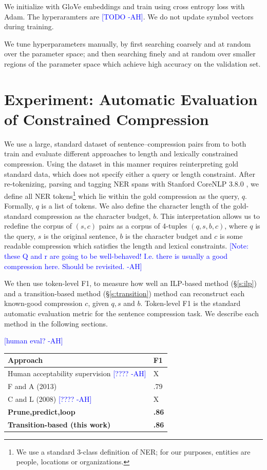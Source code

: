 \documentclass[11pt,a4paper]{article}
\newcommand{\ahcomment}[1]{\textcolor{blue}{[#1 -AH]}}
\begin{document}
We initialize with GloVe embeddings \cite{pennington2014glove} and train using cross entropy loss with Adam. The hyperaramters are \ahcomment{TODO}. We do not update symbol vectors during training. 

We tune hyperparameters manually, by first searching coarsely and at random \cite{Bergstra2012RandomSF} over the parameter space; and then searching finely and at random over smaller regions of the parameter space which achieve high accuracy on the validation set. 

\section{Experiment: Automatic Evaluation of Constrained Compression}

We use a large, standard dataset of sentence--compression pairs from \citet{filippova2013overcoming} to both train and evaluate different approaches to length and lexically constrained compression. Using the dataset in this manner requires reinterpreting gold standard data, which does not specify either a query or length constraint. After re-tokenizing, parsing and tagging NER spans with Stanford CoreNLP 3.8.0 \cite{corenlp}, we define all NER tokens\footnote{We use a standard 3-class definition of NER; for our purposes, entities are people, locations or organizations.} which lie within the gold compression as the query, $q$. Formally, $q$ is a list of tokens. We also define the character length of the gold-standard compression as the character budget, $b$. This interpretation allows us to redefine the corpus of $(s,c)$ pairs as a corpus of 4-tuples $(q,s,b,c)$, where $q$ is the query, $s$ is the original sentence, $b$ is the character budget and $c$ is some readable compression which satisfies the length and lexical constraints.  \ahcomment{Note: these Q and r are going to be well-behaved! I.e. there is usually a good compression here. Should be revisited.}

We then use token-level F1, to measure how well an ILP-based method (\S\ref{s:ilp}) and a transition-based method (\S\ref{s:transition}) method can reconstruct each known-good compression $c$, given $q,s$ and $b$. Token-level F1 is the standard automatic evaluation metric for the sentence compression task. We describe each method in the following sections.

\ahcomment{human eval?}
    
\begin{table}[htb!]
\begin{tabular}{ll}
\centering
Approach & F1  \\ \hline
Human acceptability supervision \ahcomment{????}        &  X        \\
F and A (2013)    & .79           \\
C and L (2008)  \ahcomment{????}  & X      \\
\textbf{Prune,predict,loop} &  \textbf{.86}    \\ 
\textbf{Transition-based (this work)} &  \textbf{.86}    \\   
\end{tabular}
\end{table}
\end{document}
